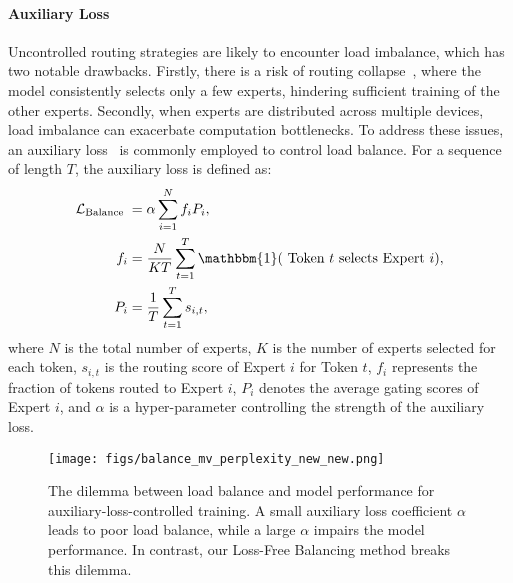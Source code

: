 \documentclass{article} %
\newcommand{\ours}{Loss-Free Balancing}
\begin{document}
\paragraph{Auxiliary Loss} Uncontrolled routing strategies are likely to encounter load imbalance, which has two notable drawbacks. 
Firstly, there is a risk of routing collapse~\citep{Shazeer2017OutrageouslyLN}, where the model consistently selects only a few experts, hindering sufficient training of the other experts. 
Secondly, when experts are distributed across multiple devices, load imbalance can exacerbate computation bottlenecks. 
To address these issues, an auxiliary loss~\citep{Fedus2021SwitchTS,Lepikhin2020GShardSG} is commonly employed to control load balance. 
For a sequence of length $T$, the auxiliary loss is defined as:
\begin{equation}
   \begin{aligned}
\mathcal{L}_{\text {Balance }} & =\alpha \sum_{i=1}^{N} f_i P_i, \\
f_i & =\frac{N}{K T} \sum_{t=1}^T \mathbbm{1}(\text { Token } t \text { selects Expert } i), \\
P_i & =\frac{1}{T} \sum_{t=1}^T s_{i, t},
\end{aligned} 
\end{equation}
where $N$ is the total number of experts, $K$ is the number of experts selected for each token, $s_{i,t}$ is the routing score of Expert $i$ for Token $t$, $f_i$ represents the fraction of tokens routed to Expert $i$, $P_i$ denotes the average gating scores of Expert $i$, and $\alpha$ is a hyper-parameter controlling the strength of the auxiliary loss.




\begin{figure}[t]
  \centering
    \texttt{[image: figs/balance\_mv\_perplexity\_new\_new.png]}
\caption{The dilemma between load balance and model performance for auxiliary-loss-controlled training. A small auxiliary loss coefficient $\alpha$ leads to poor load balance, while a large $\alpha$ impairs the model performance. In contrast, our \ours{} method breaks this dilemma.}
\label{fig:balancevsppl}
\end{figure}
\end{document}
